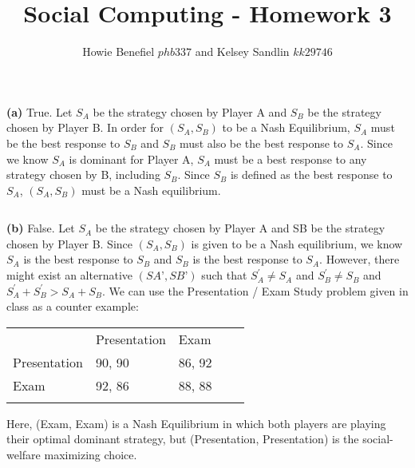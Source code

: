 \documentclass[12pt]{article}
\newenvironment{problem}[2][Problem]{\begin{trivlist}
\item[\hskip \labelsep {\bfseries #1}\hskip \labelsep {\bfseries #2.}]}{\end{trivlist}}
\newenvironment{subproblem}[1]{\textbf{(#1)}}{}
\theoremstyle{definition}
\begin{document}

\title{Social Computing - Homework 3}
\author{Howie Benefiel \(phb337\) and Kelsey Sandlin \(kk29746\) }
\maketitle

\begin{problem}{1}
\begin{subproblem}{a}
True. 
Let $ S_{A} $ be the strategy chosen by Player A and $ S_{B} $ be the strategy chosen by Player B.
In order for $ (S_{A}, S_{B}) $ to be a Nash Equilibrium, $ S_{A} $ must be the best response to $ S_{B} $ and $ S_{B} $ must also be the best response to $ S_{A} $.
Since we know $ S_{A} $ is dominant for Player A, $ S_{A} $ must be a best response to any strategy chosen by B, including $ S_{B} $. Since $ S_{B} $ is defined as the best response to $ S_{A} $, $ (S_{A}, S_{B}) $ must be a Nash equilibrium.
\end{subproblem}

$ $ \newline

\begin{subproblem}{b}
False.
Let $ S_{A} $ be the strategy chosen by Player A and SB be the strategy chosen by Player B.
Since $ (S_{A}, S_{B}) $ is given to be a Nash equilibrium, we know $ S_{A} $ is the best response to $ S_{B} $ and $ S_{B} $ is the best response to $ S_{A} $.
However, there might exist an alternative $ (SA’, SB’) $ such that $ S_{A}^{'}  \ne S_{A} $ and $ S_{B}^{'} \ne S_{B} $ and $ S_{A}^{'} + S_{B}^{'} > S_{A} +  S_{B} $.
We can use the Presentation / Exam Study problem given in class as a counter example:

\begin{table}[H]
\begin{tabular}{lllll}
\multicolumn{1}{l|}{} & \multicolumn{1}{l|}{Presentation} & \multicolumn{1}{l|}{Exam} &  &  \\ \cline{1-3}
\multicolumn{1}{l|}{Presentation}  & \multicolumn{1}{l|}{  90, 90 } & \multicolumn{1}{l|}{86, 92} &  &  \\ \cline{1-3}
\multicolumn{1}{l|}{Exam}  & \multicolumn{1}{l|}{92, 86} & \multicolumn{1}{l|}{88, 88} &  &  \\ \cline{1-3}
                       &                       &                       &  &
\end{tabular}
\end{table}
Here, (Exam, Exam) is a Nash Equilibrium in which both players are playing their optimal dominant strategy, but (Presentation, Presentation) is the social-welfare maximizing choice.

\end{subproblem}
\end{problem}
\end{document}
